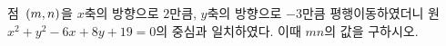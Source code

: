 점~$(m{,}\mkern3mu\mathopen{}n)$을 $x$축의 방향으로 $2$만큼, $y$축의 방향으로 $-3$만큼 평행이동하였더니 원~$x^2+y^2-6x+8y+19=0$의 중심과 일치하였다. 이때 $mn$의 값을 구하시오.
